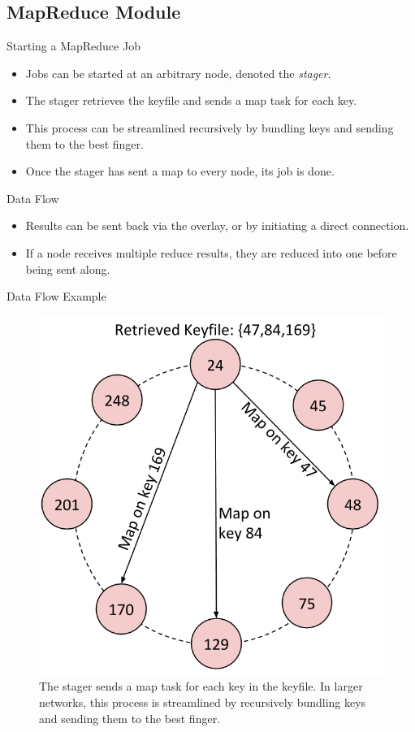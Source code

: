 \documentclass[11pt]{beamer}
\begin{document}
\subsection{MapReduce Module}

\begin{frame}{Starting a MapReduce Job}
\begin{itemize}
	\item Jobs can be started at an arbitrary node, denoted the \emph{stager}.
	\item The stager retrieves the keyfile and sends a map task for each key.
	\item This process can be streamlined recursively by bundling keys and sending them to the best finger.
	\item Once the stager has sent a map to every node, its job is done.
\end{itemize}
\end{frame}


\begin{frame}{Data Flow}
\begin{itemize}
	\item Results can be sent back via the overlay, or by initiating a direct connection.
	\item If a node receives multiple reduce results, they are reduced into one before being sent along.
\end{itemize}
 
\end{frame}



\begin{frame}{Data Flow Example}
\begin{figure}
    \includegraphics[width=0.50\linewidth]{CR_dataflow2}
    \caption{ \footnotesize{The stager sends a map task for each key in the keyfile. In larger networks, this process is streamlined by recursively bundling keys and sending them to the best finger.}}
	
\end{figure}
\end{frame}
\end{document}
